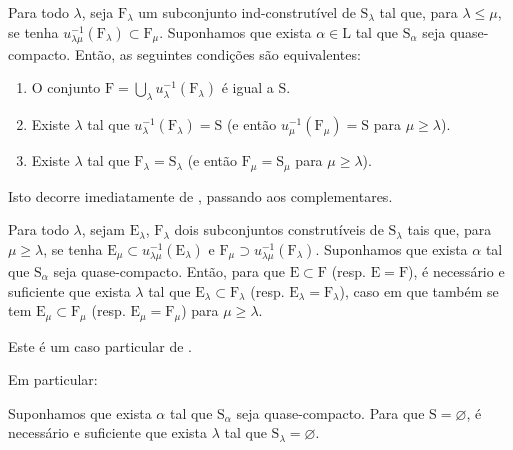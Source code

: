 \begin{corollary}[8.3.4]
\label{IV.8.3.4}
Para todo $\lambda$, seja $\mathrm{F}_\lambda$ um subconjunto ind-construtível de $\mathrm{S}_\lambda$ tal que, para $\lambda\leqslant\mu$, se tenha $u_{\lambda\mu}^{-1}(\mathrm{F}_\lambda)\subset\mathrm{F}_\mu$.
Suponhamos que exista $\alpha\in\mathrm{L}$ tal que $\mathrm{S}_\alpha$ seja quase-compacto.
Então, as seguintes condições são equivalentes:
\begin{enumerate}[label=\emph{\alph*)}]
  \item O conjunto $\mathrm{F}=\bigcup_\lambda u_\lambda^{-1}(\mathrm{F}_\lambda)$ é igual a $\mathrm{S}$.
  \item Existe $\lambda$ tal que $u_\lambda^{-1}(\mathrm{F}_\lambda)=\mathrm{S}$ (e então $u_\mu^{-1}(\mathrm{F}_\mu)=\mathrm{S}$ para $\mu\geqslant\lambda$).
  \item Existe $\lambda$ tal que $\mathrm{F}_\lambda=\mathrm{S}_\lambda$ (e então $\mathrm{F}_\mu=\mathrm{S}_\mu$ para $\mu\geqslant\lambda$).
\end{enumerate}
Isto decorre imediatamente de , passando aos complementares.
\end{corollary}

\begin{corollary}[8.3.5]
\label{IV.8.3.5}
Para todo $\lambda$, sejam $\mathrm{E}_\lambda$, $\mathrm{F}_\lambda$ dois subconjuntos construtíveis de $\mathrm{S}_\lambda$ tais que, para $\mu\geqslant\lambda$, se tenha $\mathrm{E}_\mu\subset u_{\lambda\mu}^{-1}(\mathrm{E}_\lambda)$ e $\mathrm{F}_\mu\supset u_{\lambda\mu}^{-1}(\mathrm{F}_\lambda)$.
Suponhamos que exista $\alpha$ tal que $\mathrm{S}_\alpha$ seja quase-compacto.
Então, para que $\mathrm{E}\subset\mathrm{F}$ \textnormal{(}resp. $\mathrm{E}=\mathrm{F}$\textnormal{)}, é necessário e suficiente que exista $\lambda$ tal que $\mathrm{E}_\lambda\subset\mathrm{F}_\lambda$ \textnormal{(}resp. $\mathrm{E}_\lambda=\mathrm{F}_\lambda$\textnormal{)}, caso em que também se tem $\mathrm{E}_\mu\subset\mathrm{F}_\mu$ \textnormal{(}resp. $\mathrm{E}_\mu=\mathrm{F}_\mu$\textnormal{)} para $\mu\geqslant\lambda$.

Este é um caso particular de .
\end{corollary}

Em particular:
\begin{corollary}[8.3.6]
\label{IV.8.3.6}
Suponhamos que exista $\alpha$ tal que $\mathrm{S}_\alpha$ seja quase-compacto.
Para que $\mathrm{S}=\varnothing$, é necessário e suficiente que exista $\lambda$ tal que $\mathrm{S}_\lambda=\varnothing$.
\end{corollary}

